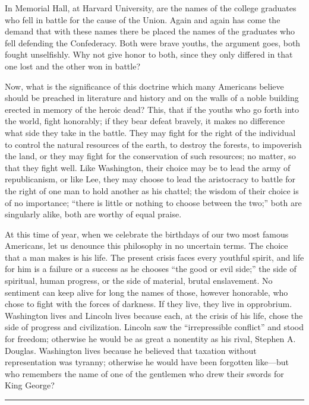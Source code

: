 \documentclass[letterpaper,10pt,english]{jupyterBook}
\begin{document}
\sphinxAtStartPar
In Memorial Hall, at Harvard University, are the names of the college graduates who fell in battle for the cause of the Union. Again and again has come the demand that with these names there be placed the names of the graduates who fell defending the Confederacy. Both were brave youths, the argument goes, both fought unselfishly. Why not give honor to both, since they only differed in that one lost and the other won in battle?

\sphinxAtStartPar
Now, what is the significance of this doctrine which many Americans believe should be preached in literature and history and on the walls of a noble building erected in memory of the heroic dead? This, that if the youths who go forth into the world, fight honorably; if they bear defeat bravely, it makes no difference what side they take in the battle. They may fight for the right of the individual to control the natural resources of the earth, to destroy the forests, to impoverish the land, or they may fight for the conservation of such resources; no matter, so that they fight well. Like Washington, their choice may be to lead the army of republicanism, or like Lee, they may choose to lead the aristocracy to battle for the right of one man to hold another as his chattel; the wisdom of their choice is of no importance; “there is little or nothing to choose between the two;” both are singularly alike, both are worthy of equal praise.

\sphinxAtStartPar
At this time of year, when we celebrate the birthdays of our two most famous Americans, let us denounce this philosophy in no uncertain terms. The choice that a man makes is his life. The present crisis faces every youthful spirit, and life for him is a failure or a success as he chooses “the good or evil side;” the side of spiritual, human progress, or the side of material, brutal enslavement. No sentiment can keep alive for long the names of those, however honorable, who chose to fight with the forces of darkness. If they live, they live in opprobrium. Washington lives and Lincoln lives because each, at the crisis of his life, chose the side of progress and civilization. Lincoln saw the “irrepressible conflict” and stood for freedom; otherwise he would be as great a nonentity as his rival, Stephen A. Douglas. Washington lives because he believed that taxation without representation was tyranny; otherwise he would have been forgotten like—but who remembers the name of one of the gentlemen who drew their swords for King George?


\bigskip\hrule\bigskip
\end{document}
